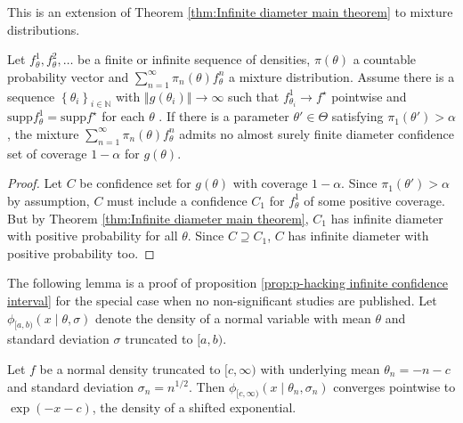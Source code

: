 \documentclass[twoside]{article}
\begin{document}
This is an extension of Theorem \ref{thm:Infinite diameter main theorem}
to mixture distributions.
\begin{prop}
\label{cor:Mixture model corollary}Let $f_{\theta}^{1},f_{\theta}^{2},\ldots$
be a finite or infinite sequence of densities, $\pi(\theta)$
a countable probability vector and $\sum_{n=1}^{\infty}\pi_{n}(\theta)f_{\theta}^{n}$
a mixture distribution. Assume there is a sequence $\left\{ \theta_{i}\right\} _{i\in\mathbb{N}}$
with $\left\Vert g(\theta_{i})\right\Vert \to\infty$ such
that $f_{\theta_{i}}^{1}\to f^{\star}$ pointwise and $\textrm{supp}f_{\theta}^{1} = \textrm{supp}f^{\star}$
for each $\theta$ . If there is a parameter $\theta'\in\Theta$ satisfying
$\pi_{1}(\theta')>\alpha$, the mixture $\sum_{n=1}^{\infty}\pi_{n}(\theta)f_{\theta}^{n}$
admits no almost surely finite diameter confidence set of coverage
$1-\alpha$ for $g(\theta)$.
\end{prop}

\begin{proof}
Let $C$ be confidence set for $g(\theta)$ with coverage
$1-\alpha$. Since $\pi_{1}(\theta')>\alpha$ by assumption,
$C$ must include a confidence $C_{1}$ for $f_{\theta}^{1}$ of some
positive coverage. But by Theorem \ref{thm:Infinite diameter main theorem},
$C_{1}$ has infinite diameter with positive probability for all $\theta$.
Since $C\supseteq C_{1}$, $C$ has infinite diameter with positive
probability too.
\end{proof}
The following lemma is a proof of proposition \ref{prop:p-hacking infinite confidence interval}
for the special case when no non-significant studies are published.
Let $\phi_{[a,b)}(x\mid\theta,\sigma)$ denote
the density of a normal variable with mean $\theta$ and standard
deviation $\sigma$ truncated to $[a,b)$.
\begin{lem}
\label{lem:One-sided normal limit}Let $f$ be a normal density truncated
to $[c,\infty)$ with underlying mean $\theta_{n}=-n-c$
and standard deviation $\sigma_{n}=n^{1/2}$. Then $\phi_{[c,\infty)}(x\mid\theta_{n},\sigma_{n})$
converges pointwise to $\exp(-x-c)$, the density of a
shifted exponential.
\end{lem}
\end{document}
